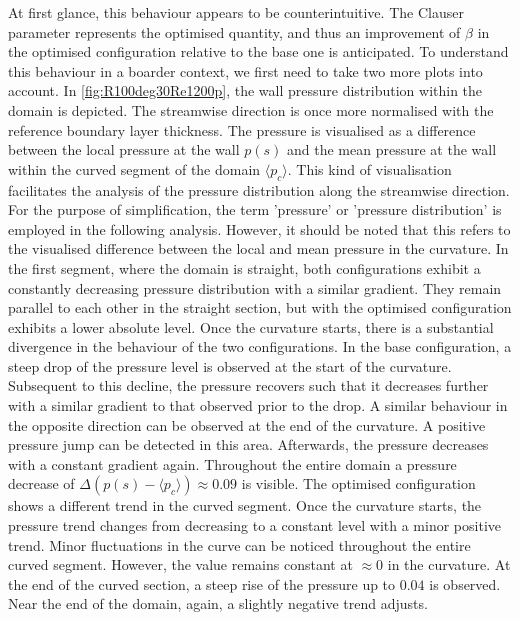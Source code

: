 At first glance, this behaviour appears to be counterintuitive. The   Clauser parameter represents the optimised quantity, and thus an improvement of $\beta$ in the optimised configuration relative to the base one is  anticipated.
To understand this behaviour in a boarder context, we first need to take two more plots into account.
In \autoref{fig:R100deg30Re1200p}, the wall pressure distribution within the domain is depicted.
The streamwise direction is once more normalised with the reference boundary layer thickness. The pressure is visualised as a difference between the local pressure at the wall $p(s)$ and the mean pressure at the wall within the curved segment of the domain $\langle p_c \rangle$.
This kind of visualisation facilitates the analysis of the pressure distribution along the streamwise direction. For the purpose of simplification, the term 'pressure' or 'pressure distribution' is employed in the following analysis.
However, it should be noted that this refers to the visualised difference between the local and mean pressure in the curvature. 
In the first segment, where the domain is straight, both configurations exhibit a constantly decreasing pressure distribution with a similar gradient.
They remain parallel to each other in the straight section, but with the optimised configuration exhibits a lower absolute level.
Once the curvature starts, there  is a substantial divergence in the behaviour of the two configurations.
In the base configuration, a steep drop of the pressure level is observed at the start of the curvature. 
Subsequent to this decline,  the pressure recovers such that it decreases further with a similar gradient  to that observed prior to the drop. 
A similar behaviour in the opposite direction can be  observed at the end of the curvature.
A positive pressure jump can be detected in this area.
Afterwards, the pressure decreases with a constant gradient again.
Throughout  the entire domain  a pressure decrease of $\Delta(p(s)-\langle p_c \rangle) \approx 0.09$ is visible.
The optimised configuration shows a different trend  in the curved segment.
Once the curvature starts, the pressure trend changes from decreasing to a constant level with a minor positive trend.
Minor fluctuations in the curve can be noticed throughout the entire  curved segment.
However, the value remains constant at  $\approx 0$ in the curvature. 
At the end of the curved section, a steep rise of the pressure up to $0.04$ is observed.
Near the end of the domain, again, a slightly negative trend adjusts.


